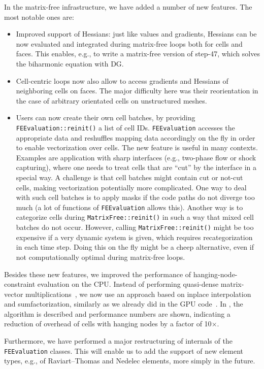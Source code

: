 \documentclass{ansarticle-preprint}
\begin{document}
In the matrix-free infrastructure, we have added a number of new features. The most
notable ones are:
\begin{itemize}
\item Improved support of Hessians: just like values and gradients, Hessians can be
now evaluated and integrated during matrix-free loops
both for cells and faces. This enables, e.g., to write
a matrix-free version of step-47, which solves the biharmonic equation with DG.
\item Cell-centric loops now also allow to access gradients and Hessians
of neighboring cells on faces. The major difficulty here was their reorientation
in the case of arbitrary orientated cells on unstructured meshes.
\item Users can now create their own cell batches, by providing \texttt{FEEvaluation::reinit()} a list of cell IDs. \texttt{FEEvaluation}
accesses the appropriate data and reshuffles mapping data accordingly on
the fly in order to enable vectorization over cells. The new feature is useful in many
contexts. Examples are application with sharp interfaces (e.g., two-phase flow
or shock capturing), where one needs to treat cells that are ``cut'' by
the interface in a special way. A challenge is that cell batches
might contain cut or not-cut cells, making vectorization potentially more complicated. One way to deal with such cell batches is to apply masks if
the code paths do not diverge too much
(a lot of functions of \texttt{FEEvaluation} allows this). Another way is to
categorize cells during \texttt{MatrixFree::reinit()} in such a way that mixed cell batches do not occur. However, calling  \texttt{MatrixFree::reinit()}
might be too expensive if a very dynamic system is given, which requires
recategorization in each time step. Doing this on the fly might be a cheep alternative, even if not computationally optimal during matrix-free loops.
\end{itemize}
Besides these new features, we improved the performance of 
hanging-node-constraint evaluation on the CPU. Instead of performing
quasi-dense matrix-vector multiplications~\cite{KronbichlerKormann2012}, we now use an
approach based on inplace interpolation and sumfactorization, similarly
as we already did in the GPU code~\cite{ljungkvist2017matrix}. In \cite{munch2022hn}, the algorithm is described 
and performance numbers are shown, indicating a reduction
of overhead of cells with hanging nodes by a factor of 10$\times$.

Furthermore, we have performed a major restructuring of internals
of the \texttt{FEEvaluation} classes. This will enable us to add the support of new element types, e.g., of 
Raviart--Thomas and Nedelec elements,  more
simply in the future.
\end{document}
